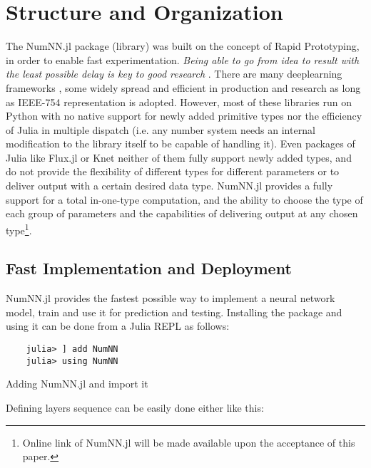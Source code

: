 \section{Structure and Organization}

The NumNN.jl  package%
 (library) was built on the concept of Rapid Prototyping, in order to enable fast experimentation. \emph{Being able to go from idea to result with the least possible delay is key to good research} \cite{Keras}. There are many deeplearning frameworks \cite{Abadi2016,Collet2015,Jia2014,Paszke2017,PyTorch2019}, some widely spread and efficient in production and research as long as IEEE-754 representation is adopted. However, most of these libraries run on Python with no native support for newly added primitive types nor the efficiency of Julia in multiple dispatch (i.e. any number system needs an internal modification to the library itself to be capable of handling it). Even packages of Julia like Flux.jl \cite{Flux.jl-2018,Innes2018} or Knet \cite{Yuret2016k} neither of them fully support newly added types, and do not provide the flexibility of different types for different parameters or to deliver output with a certain desired data type. NumNN.jl provides a fully support for a total in-one-type computation, and the ability to choose the type of each group of parameters and the capabilities of delivering output at any chosen type\footnote{Online link of NumNN.jl will be made available upon the acceptance  of this paper.}.

\subsection{Fast Implementation and Deployment}

NumNN.jl provides the fastest possible way to implement a neural network model, train and use it for prediction and testing. Installing the package and using it can be done from a Julia REPL as follows:

\begin{listing}[H]
	\begin{verbatim}
	julia> ] add NumNN
	julia> using NumNN
	\end{verbatim}
	\caption{Adding NumNN.jl and import it}\label{addimport}
\end{listing}

Defining layers sequence can be easily done either like this:

